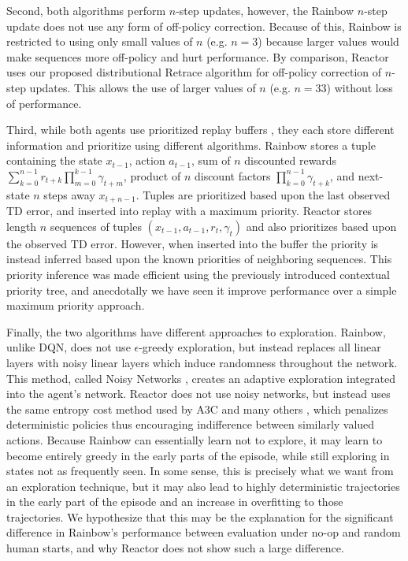 \documentclass{article}
\begin{document}
Second, both algorithms perform $n$-step updates, however, the Rainbow $n$-step 
update does not use any form of off-policy correction. Because of this, Rainbow 
is restricted to using only small values of $n$ (e.g. $n = 3$) because larger 
values would make sequences more off-policy and hurt performance. By comparison, 
Reactor uses our proposed distributional Retrace algorithm for off-policy 
correction of $n$-step updates. This allows the use of larger values of $n$ 
(e.g. $n = 33$) without loss of performance.

Third, while both agents use prioritized replay buffers 
\citep{schaul16prioritized}, they each store different information and 
prioritize using different algorithms. Rainbow stores a tuple containing the 
state $x_{t-1}$, action $a_{t-1}$, sum of $n$ discounted rewards 
$\sum_{k=0}^{n-1} r_{t+k} \prod_{m=0}^{k-1} \gamma_{t+m}$, product of $n$ 
discount factors $\prod_{k=0}^{n-1} \gamma_{t+k}$, and next-state $n$ steps away 
$x_{t+n-1}$. Tuples are prioritized based upon the last observed TD error, and 
inserted into replay with a maximum priority. Reactor stores length $n$ 
sequences of tuples $(x_{t-1}, a_{t-1}, r_t, \gamma_t)$ and also prioritizes 
based upon the observed TD error. However, when inserted into the buffer the 
priority is instead inferred based upon the known priorities of neighboring 
sequences. This priority inference was made efficient using the previously 
introduced contextual priority tree, and anecdotally we have seen it improve 
performance over a simple maximum priority approach.

Finally, the two algorithms have different approaches to exploration. 
Rainbow, unlike DQN, does not use $\epsilon$-greedy exploration, but instead 
replaces all linear layers with noisy linear layers which induce randomness 
throughout the network. This method, called Noisy Networks 
\citep{fortunato2017noisy}, creates an adaptive exploration integrated into the 
agent's network. Reactor does not use noisy networks, but instead uses the same 
entropy cost method used by A3C and many others \citep{mnih2016asynchronous}, 
which penalizes deterministic policies thus encouraging indifference between 
similarly valued actions. Because Rainbow can essentially learn not to explore, 
it may learn to become entirely greedy in the early parts of the episode, while 
still exploring in states not as frequently seen. In some sense, this is 
precisely what we want from an exploration technique, but it may also lead to 
highly deterministic trajectories in the early part of the episode and an 
increase in overfitting to those trajectories. We hypothesize that this may be 
the explanation for the significant difference in Rainbow's performance between 
evaluation under no-op and random human starts, and why Reactor does not show 
such a large difference.
\end{document}
